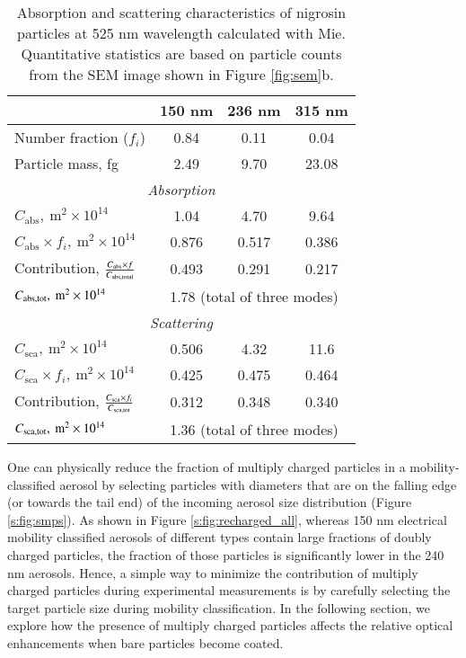 \begin{table}[htp]
    \centering
    \caption{Absorption and scattering characteristics of nigrosin particles at 525 nm wavelength calculated with Mie. Quantitative statistics are based on particle counts from the SEM image shown in Figure \ref{fig:sem}b.}
    \begin{tabular}{l c c c}
        \hline
        & 150 nm & 236 nm & 315 nm \\
        \hline
        Number fraction ($f_i$) & 0.84 & 0.11 & 0.04 \\
        Particle mass, fg & 2.49 & 9.70 & 23.08 \\
        \multicolumn{4}{c}{\textit{Absorption}} \\
        \hline
        $C_{\mathrm{abs}},\ \mathrm{m}^2\times10^{14}$ & 1.04 & 4.70 & 9.64 \\
        $C_{\mathrm{abs}}\times f_i,\ \mathrm{m}^2\times10^{14}$ & 0.876 & 0.517 & 0.386 \\
        Contribution, $C_{\mathrm{abs}}\times f\over C_{\mathrm{abs,total}}$ & 0.493 & 0.291 & 0.217 \\
        $C_{\rm abs,tot},\ \rm m^2\times10^{14}$ & \multicolumn{3}{c}{1.78 (total of three modes)} \\
        \multicolumn{4}{c}{\textit{Scattering}} \\
        \hline
        $C_\mathrm{sca},\ \mathrm{m}^2\times 10^{14}$ & 0.506 & 4.32 & 11.6 \\
        $C_\mathrm{sca}\times f_i,\ \mathrm{m}^2\times 10^{14}$ & 0.425 & 0.475 & 0.464 \\
        Contribution, $C_\mathrm{sca}\times f_i\over C_\mathrm{sca,tot}$ & 0.312 & 0.348 & 0.340 \\
        $C_{\rm sca,tot},\ \rm m^2\times10^{14}$ & \multicolumn{3}{c}{1.36 (total of three modes)} \\
        \hline
    \end{tabular}
    \label{tab:absorption_mie}
\end{table}

One can physically reduce the fraction of multiply charged particles in a mobility-classified aerosol by selecting particles with diameters that are on the falling edge (or towards the tail end) of the incoming aerosol size distribution (Figure \ref{s:fig:smps}). As shown in Figure \ref{s:fig:recharged_all}, whereas 150 nm electrical mobility classified aerosols of different types contain large fractions of doubly charged particles, the fraction of those particles is significantly lower in the 240 nm aerosols. Hence, a simple way to minimize the contribution of multiply charged particles during experimental measurements is by carefully selecting the target particle size during mobility classification. In the following section, we explore how the presence of multiply charged particles affects the relative optical enhancements when bare particles become coated.

